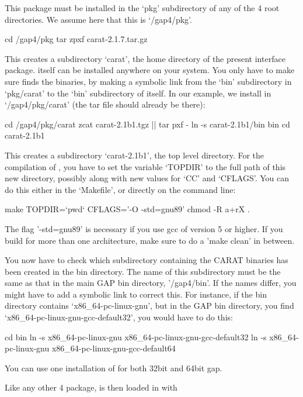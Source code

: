 
This package must be installed in the `pkg' subdirectory of any of
the {\GAP} 4 root directories. We assume here that this is `/gap4/pkg'.

\begintt
cd /gap4/pkg
tar zpxf carat-2.1.7.tar.gz
\endtt

This creates a subdirectory `carat', the home directory of the present
interface package. {\CARAT} itself can be installed anywhere on your 
system. You only have to make sure {\GAP} finds the {\CARAT} binaries, 
by making a symbolic link from the `bin' subdirectory in `pkg/carat' to 
the `bin' subdirectory of {\CARAT} itself. In our example, we install 
{\CARAT} in `/gap4/pkg/carat' (the {\CARAT} tar file should already be 
there):

\begintt
cd /gap4/pkg/carat
zcat carat-2.1b1.tgz || tar pxf -
ln -s carat-2.1b1/bin bin
cd carat-2.1b1
\endtt

This creates a subdirectory `carat-2.1b1', the {\CARAT} top level directory. 
For the compilation of {\CARAT}, you have to set the variable `TOPDIR' to the 
full path of this new directory, possibly along with new values for `CC' and 
`CFLAGS'. You can do this either in the `Makefile', or directly on the command 
line:

\begintt
make TOPDIR=`pwd` CFLAGS='-O -std=gnu89' 
chmod -R a+rX .
\endtt

The flag '-std=gnu89' is necessary if you use gcc of version 5 or higher.
If you build for more than one architecture, make sure to do a 
'make clean' in between.

You now have to check which subdirectory containing the CARAT 
binaries has been created in the bin directory. The name of this
subdirectory must be the same as that in the main GAP bin directory,
'/gap4/bin'. If the names differ, you might have to add a symbolic
link to correct this. For instance, if the {\CARAT} bin directory
contains `x86_64-pc-linux-gnu', but in the GAP bin directory, you find 
`x86_64-pc-linux-gnu-gcc-default32', you would have to do this:

\begintt
cd bin
ln -s x86_64-pc-linux-gnu x86_64-pc-linux-gnu-gcc-default32
ln -s x86_64-pc-linux-gnu x86_64-pc-linux-gnu-gcc-default64
\endtt

You can use one installation of {\CARAT} for both 32bit and 64bit gap.

Like any other {\GAP} 4 package, {\CARAT} is then loaded in {\GAP} with

